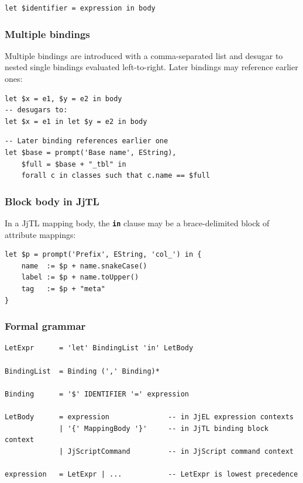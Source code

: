 \documentclass[11pt,a4paper]{article}
\newcommand{\jjtl}{\textsf{JjTL}}
\newcommand{\kw}[1]{\texttt{\textbf{#1}}}
\begin{document}
\begin{lstlisting}[style=jjel,numbers=none]
let $identifier = expression in body
\end{lstlisting}

\subsubsection{Multiple bindings}

Multiple bindings are introduced with a comma-separated list and desugar
to nested single bindings evaluated left-to-right. Later bindings may
reference earlier ones:

\begin{lstlisting}[style=jjel,numbers=none]
let $x = e1, $y = e2 in body
-- desugars to:
let $x = e1 in let $y = e2 in body
\end{lstlisting}

\begin{lstlisting}[style=jjel,numbers=none]
-- Later binding references earlier one
let $base = prompt('Base name', EString),
    $full = $base + "_tbl" in
    forall c in classes such that c.name == $full
\end{lstlisting}

\subsubsection{Block body in JjTL}

In a \jjtl{} mapping body, the \kw{in} clause may be a brace-delimited
block of attribute mappings:

\begin{lstlisting}[style=jjtl,numbers=none]
let $p = prompt('Prefix', EString, 'col_') in {
    name  := $p + name.snakeCase()
    label := $p + name.toUpper()
    tag   := $p + "meta"
}
\end{lstlisting}

\subsubsection{Formal grammar}

\begin{lstlisting}[style=grammar,caption={JjLet grammar in EBNF}]
LetExpr      = 'let' BindingList 'in' LetBody

BindingList  = Binding (',' Binding)*

Binding      = '$' IDENTIFIER '=' expression

LetBody      = expression              -- in JjEL expression contexts
             | '{' MappingBody '}'     -- in JjTL binding block context
             | JjScriptCommand         -- in JjScript command context

expression   = LetExpr | ...           -- LetExpr is lowest precedence
\end{lstlisting}
\end{document}
